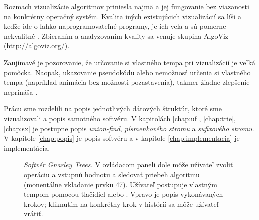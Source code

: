Rozmach vizualizácie algoritmov priniesla najmä \Java a jej fungovanie 
bez viazanosti na konkrétny operačný systém. Kvalita iných existujúcich 
vizualizácií sa líši a keďže ide o ľahko naprogramovateľné programy, je ich 
veľa a sú pomerne nekvalitné \citep{shaffer}. 
Zbieraním a analyzovaním kvality sa venuje skupina AlgoViz (\hbox{\url{http://algoviz.org/}}).

Zaujímavé je pozorovanie, že určovanie si vlastného tempa pri vizualizácií 
je veľká pomôcka. Naopak, ukazovanie pseudokódu alebo nemožnosť určenia si
vlastného tempa (napríklad animácia bez možnosti pozastavenia), takmer 
žiadne zlepšenie neprináša \citep{shaffer,saraiya}.


Prácu sme rozdelili na popis jednotlivých dátových štruktúr, ktoré sme 
vizualizovali a popis samotného softvéru. V kapitolách 
\ref{chap:uf}, \ref{chap:trie}, \ref{chap:sx} je postupne popis \emph{union-find}, 
\emph{písmenkového stromu} a \emph{sufixového stromu}. V kapitole 
\ref{chap:popis} je popis softvéru a v kapitole 
\ref{chap:implementacia} je implementácia.
 
\begin{figure}
\centering
{}
\caption{\emph{Softvér Gnarley Trees.} V ovládacom paneli dole môže užívateľ
zvoliť operáciu a vstupnú hodnotu a sledovať priebeh algoritmu (monentálne vkladanie
prvku 47). Užívateľ postupuje vlastným tempom  pomocou tlačidiel  alebo
. Vpravo je popis vykonávaných krokov; kliknutím na konkrétny krok v histórií
sa môže užívateľ vrátiť.}
\label{img:historia} 
\end{figure}
